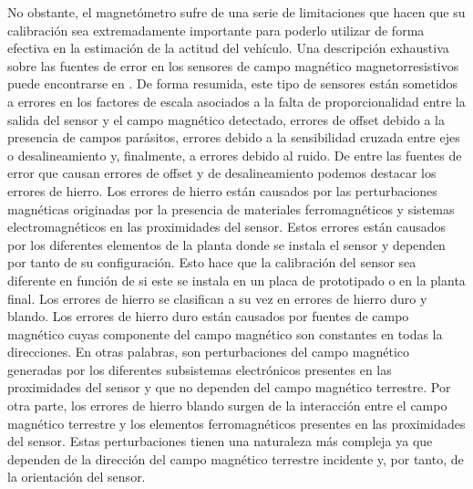 \documentclass[a4paper,12pt]{book}
\begin{document}
No obstante, el magnetómetro sufre de una serie de limitaciones que hacen que su calibración sea extremadamente importante para poderlo utilizar de forma efectiva en la estimación de la actitud del vehículo. Una descripción exhaustiva sobre las fuentes de error en los sensores de campo magnético magnetorresistivos puede encontrarse en \cite{renaudin2010complete}. De forma resumida, este tipo de sensores están sometidos a errores en los factores de escala asociados a la falta de proporcionalidad entre la salida del sensor y el campo magnético detectado, errores de offset debido a la presencia de campos parásitos, errores debido a la sensibilidad cruzada entre ejes o desalineamiento y, finalmente, a errores debido al ruido. De entre las fuentes de error que causan errores de offset y de desalineamiento podemos destacar los errores de hierro. Los errores de hierro están causados por las perturbaciones magnéticas originadas por la presencia de materiales ferromagnéticos y sistemas electromagnéticos en las proximidades del sensor. Estos errores están causados por los diferentes elementos de la planta donde se instala el sensor y dependen por tanto de su configuración. Esto hace que la calibración del sensor sea diferente en función de si este se instala en un placa de prototipado o en la planta final. Los errores de hierro se clasifican a su vez en errores de hierro duro y blando. Los errores de hierro duro están causados por fuentes de campo magnético cuyas componente del campo magnético son constantes en todas la direcciones. En otras palabras, son perturbaciones del campo magnético generadas por los diferentes subsistemas electrónicos presentes en las proximidades del sensor y que no dependen del campo magnético terrestre. Por otra parte, los errores de hierro blando surgen de la interacción entre el campo magnético terrestre y los elementos ferromagnéticos presentes en las proximidades del sensor. Estas perturbaciones tienen una naturaleza más compleja ya que dependen de la dirección del campo magnético terrestre incidente y, por tanto, de la orientación del sensor.
\end{document}
